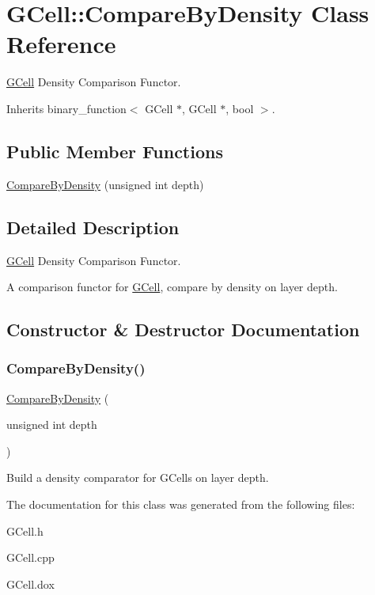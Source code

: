 \hypertarget{classKatabatic_1_1GCell_1_1CompareByDensity}{}\section{G\+Cell\+:\+:Compare\+By\+Density Class Reference}
\label{classKatabatic_1_1GCell_1_1CompareByDensity}


\mbox{\hyperlink{classKatabatic_1_1GCell}{G\+Cell}} Density Comparison Functor.  




Inherits binary\+\_\+function$<$ G\+Cell $\ast$, G\+Cell $\ast$, bool $>$.

\subsection*{Public Member Functions}
\begin{DoxyCompactItemize}
\item 
\mbox{\hyperlink{classKatabatic_1_1GCell_1_1CompareByDensity_a3a51c3a473276097f23c5f58c6800f9b}{Compare\+By\+Density}} (unsigned int depth)
\end{DoxyCompactItemize}


\subsection{Detailed Description}
\mbox{\hyperlink{classKatabatic_1_1GCell}{G\+Cell}} Density Comparison Functor. 

A comparison functor for \mbox{\hyperlink{classKatabatic_1_1GCell}{G\+Cell}}, compare by density on layer {\ttfamily depth}. 

\subsection{Constructor \& Destructor Documentation}
\mbox{\label{classKatabatic_1_1GCell_1_1CompareByDensity_a3a51c3a473276097f23c5f58c6800f9b}} 
\subsubsection{\texorpdfstring{Compare\+By\+Density()}{CompareByDensity()}}
{\footnotesize\ttfamily \mbox{\hyperlink{classKatabatic_1_1GCell_1_1CompareByDensity}{Compare\+By\+Density}} (\begin{DoxyParamCaption}\item[{unsigned int}]{depth }\end{DoxyParamCaption})}

Build a density comparator for G\+Cells on layer {\ttfamily depth}. 

The documentation for this class was generated from the following files\+:\begin{DoxyCompactItemize}
\item 
G\+Cell.\+h\item 
G\+Cell.\+cpp\item 
G\+Cell.\+dox\end{DoxyCompactItemize}
